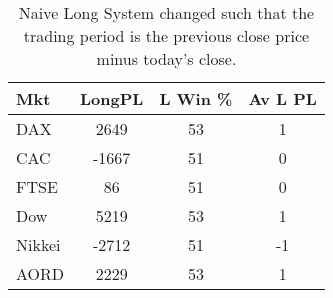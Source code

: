 \begin{table}[ht]
\centering
\caption[Results from the Naive Long System trading close to close]{Naive Long System changed such that the trading period is the previous close price minus today's close.} 
\label{tab:nlng_results_2}
\begin{tabular}{lccc}
  \toprule Mkt & LongPL & L Win \% & Av L PL \\ 
  \midrule DAX & 2649 & 53 & 1 \\ 
  CAC & -1667 & 51 & 0 \\ 
  FTSE & 86 & 51 & 0 \\ 
  Dow & 5219 & 53 & 1 \\ 
  Nikkei & -2712 & 51 & -1 \\ 
  AORD & 2229 & 53 & 1 \\ 
   \bottomrule \end{tabular}
\end{table}

